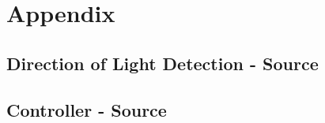 \documentclass[paper=a4, fontsize=12pt]{scrartcl}	%
\numberwithin{equation}{section}		%
\numberwithin{figure}{section}			%
\numberwithin{table}{section}				%
\begin{document}
\section{Appendix}
\subsection{Direction of Light Detection - Source}

\subsection{Controller - Source}


\end{document}
